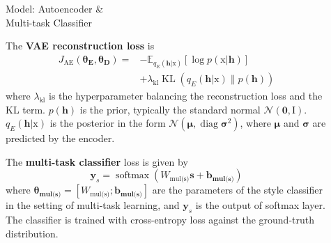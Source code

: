 \documentclass[final]{beamer}
\newlength{\sepwid}
\newlength{\onecolwid}
\newlength{\twocolwid}
\newcommand{\rmx}{\mathrm x}
\newcommand{\loss}[1]{J_{\text{#1}}}
\newcommand{\hyp}[1]{\lambda_{\text{#1}}}
\newcommand{\nnweight}[1]{\bm{\theta_{\text{#1}}}}
\newcommand{\weight}[1]{W_{\text{#1}}}
\newcommand{\bias}[1]{\bm{b_{\text{#1}}}}
\begin{document}
\begin{frame}[t]
\begin{columns}[t]
\begin{column}{\onecolwid}

        \end{column} %

        \begin{column}{\sepwid}\end{column} %

        \begin{column}{\twocolwid} %

            \begin{columns}[t,totalwidth=\twocolwid] %

                \begin{column}{\onecolwid}\vspace{-.6in} %

                    \begin{block}{Model: Autoencoder \&\\Multi-task Classifier}

                        The \textbf{VAE \cite{kingma2013auto} reconstruction loss} is
                        \begin{align*}
                            \loss{AE}(\nnweight{E}, \nnweight{D}) = & - \mathbb{E}_{q_{E}(\bm h|\rmx)} [\log p(\rmx|\bm h)]    \\
                                                                    & + \hyp{kl}\operatorname{KL}(q_{E}(\bm h|\rmx)\|p(\bm h))
                        \end{align*}
                        where $\hyp{kl}$ is the hyperparameter balancing the reconstruction loss and the KL term. $p(\bm h)$ is the prior, typically the standard normal  $\mathcal{N}(\bm 0,\mathrm I)$. $q_E(\bm h|\mathrm x)$ is the posterior in the form $\mathcal{N}(\bm \mu,\operatorname{diag} \bm\sigma^2)$, where $\bm\mu$ and $\bm\sigma$ are predicted by the encoder.

                        The \textbf{multi-task classifier} loss is given by
                        \begin{equation*}
                            \bm y_s = \operatorname{softmax}(\weight{mul(s)} \bm s + \bias{mul(s)})
                        \end{equation*}
                        where $\nnweight{mul(s)}=[\weight{mul(s)}; \bias{mul(s)}]$ are the parameters of the style classifier in the setting of multi-task learning, and $\bm y_s$ is the output of softmax layer.
                        The classifier is trained with cross-entropy loss against the ground-truth distribution.


\end{block}
\end{column}
\end{columns}
\end{column}
\end{columns}
\end{frame}
\end{document}
